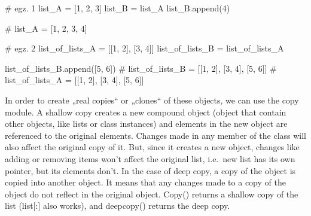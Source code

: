 \documentclass[
  letterpaper,
]{book}
\newenvironment{Shaded}{\begin{snugshade}}{\end{snugshade}}
\newcommand{\CommentTok}[1]{\textcolor[rgb]{0.37,0.37,0.37}{#1}}
\newcommand{\DecValTok}[1]{\textcolor[rgb]{0.68,0.00,0.00}{#1}}
\newcommand{\NormalTok}[1]{\textcolor[rgb]{0.00,0.23,0.31}{#1}}
\newcommand{\OperatorTok}[1]{\textcolor[rgb]{0.37,0.37,0.37}{#1}}
\begin{document}
\begin{Shaded}
\begin{Highlighting}[]
\CommentTok{\# egz. 1}
\NormalTok{list\_A }\OperatorTok{=}\NormalTok{ [}\DecValTok{1}\NormalTok{, }\DecValTok{2}\NormalTok{, }\DecValTok{3}\NormalTok{]}
\NormalTok{list\_B }\OperatorTok{=}\NormalTok{ list\_A}
\NormalTok{list\_B.append(}\DecValTok{4}\NormalTok{)}

\CommentTok{\# list\_A = [1, 2, 3, 4]}
\end{Highlighting}
\end{Shaded}

\begin{Shaded}
\begin{Highlighting}[]
\CommentTok{\# egz. 2}
\NormalTok{list\_of\_lists\_A }\OperatorTok{=}\NormalTok{ [[}\DecValTok{1}\NormalTok{, }\DecValTok{2}\NormalTok{], [}\DecValTok{3}\NormalTok{, }\DecValTok{4}\NormalTok{]]}
\NormalTok{list\_of\_lists\_B }\OperatorTok{=}\NormalTok{ list\_of\_lists\_A}

\NormalTok{list\_of\_lists\_B.append([}\DecValTok{5}\NormalTok{, }\DecValTok{6}\NormalTok{])}
\CommentTok{\# list\_of\_lists\_B = [[1, 2], [3, 4], [5, 6]]}
\CommentTok{\# list\_of\_lists\_A = [[1, 2], [3, 4], [5, 6]]}
\end{Highlighting}
\end{Shaded}

In order to create „real copies`` or „clones`` of these objects, we can
use the copy module. A shallow copy creates a new compound object
(object that contain other objects, like lists or class instances) and
elements in the new object are referenced to the original elements.
Changes made in any member of the class will also affect the original
copy of it. But, since it creates a new object, changes like adding or
removing items won't affect the original list, i.e.~new list has its own
pointer, but its elements don't. In the case of deep copy, a copy of the
object is copied into another object. It means that any changes made to
a copy of the object do not reflect in the original object. Copy()
returns a shallow copy of the list (list{[}:{]} also works), and
deepcopy() returns the deep copy.
\end{document}
